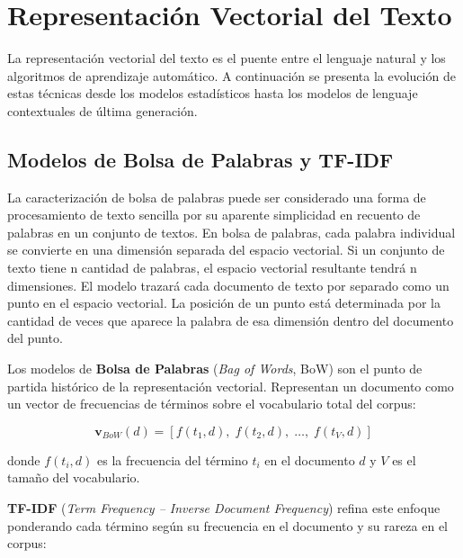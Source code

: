 \section{Representación Vectorial del Texto}

La representación vectorial del texto es el puente entre el lenguaje natural
y los algoritmos de aprendizaje automático. A continuación se presenta la
evolución de estas técnicas desde los modelos estadísticos hasta los modelos
de lenguaje contextuales de última generación.

\subsection{Modelos de Bolsa de Palabras y TF-IDF}

La caracterización de bolsa de palabras puede ser considerado una forma de procesamiento de texto
sencilla por su aparente simplicidad en recuento de palabras en un conjunto de textos.
En bolsa de palabras, cada palabra individual se convierte en una dimensión separada del espacio
vectorial. Si un conjunto de texto tiene n cantidad de palabras, el espacio vectorial resultante tendrá
n dimensiones. El modelo trazará cada documento de texto por separado como un punto en el
espacio vectorial. La posición de un punto está determinada por la cantidad de veces que aparece la
palabra de esa dimensión dentro del documento del punto.

Los modelos de \textbf{Bolsa de Palabras} (\textit{Bag of Words}, BoW) son el
punto de partida histórico de la representación vectorial. Representan un
documento como un vector de frecuencias de términos sobre el vocabulario total
del corpus:

\begin{equation}
  \mathbf{v}_{BoW}(d) = [f(t_1, d),\; f(t_2, d),\; \ldots,\; f(t_V, d)]
  \label{eq:bow}
\end{equation}

donde $f(t_i, d)$ es la frecuencia del término $t_i$ en el documento $d$ y $V$
es el tamaño del vocabulario.

\textbf{TF-IDF} (\textit{Term Frequency – Inverse Document Frequency}) refina
este enfoque ponderando cada término según su frecuencia en el documento y su
rareza en el corpus:

